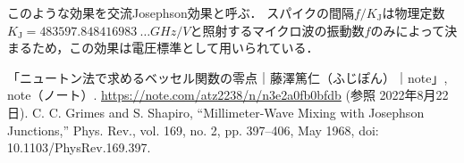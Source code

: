 \documentclass[dvipdfmx,autodetect-engine,12pt,fleqn]{jsarticle}
\begin{document}
このような効果を交流Josephson効果と呼ぶ．
スパイクの間隔$f/K_{\text{J}}$は物理定数$K_{\text{J}}=\SI{483597.848416983 }{\dots GHz/V}$と照射するマイクロ波の振動数$f$のみによって決まるため，この効果は電圧標準として用いられている．

\begin{thebibliography}{99}
   「ニュートン法で求めるベッセル関数の零点｜藤澤篤仁（ふじぽん）｜note」, note（ノート）. \url{https://note.com/atz2238/n/n3e2a0fb0bfdb} (参照 2022年8月22日).
   C. C. Grimes and S. Shapiro, “Millimeter-Wave Mixing with Josephson Junctions,” Phys. Rev., vol. 169, no. 2, pp. 397–406, May 1968, doi: 10.1103/PhysRev.169.397.
\end{thebibliography}
\end{document}
